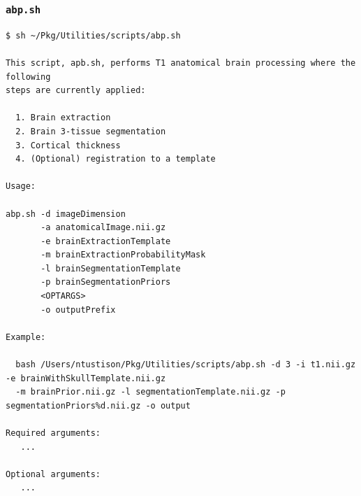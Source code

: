 \documentclass[xcolor=dvipsnames,serif,10pt]{beamer}
\begin{document}

\begin{frame}[fragile]
\frametitle{\texttt{abp.sh}}

\begin{lstlisting}
$ sh ~/Pkg/Utilities/scripts/abp.sh 

This script, apb.sh, performs T1 anatomical brain processing where the following
steps are currently applied:

  1. Brain extraction
  2. Brain 3-tissue segmentation
  3. Cortical thickness
  4. (Optional) registration to a template

Usage:

abp.sh -d imageDimension
       -a anatomicalImage.nii.gz
       -e brainExtractionTemplate
       -m brainExtractionProbabilityMask
       -l brainSegmentationTemplate
       -p brainSegmentationPriors
       <OPTARGS>
       -o outputPrefix

Example:

  bash /Users/ntustison/Pkg/Utilities/scripts/abp.sh -d 3 -i t1.nii.gz -e brainWithSkullTemplate.nii.gz
  -m brainPrior.nii.gz -l segmentationTemplate.nii.gz -p segmentationPriors%d.nii.gz -o output

Required arguments:
   ...

Optional arguments:
   ...

\end{lstlisting}                 

\end{frame}

\end{document}
